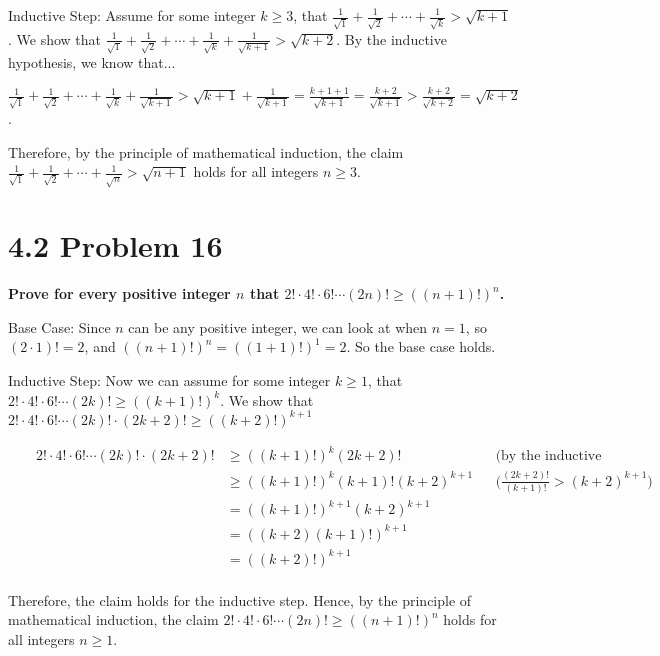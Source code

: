 \documentclass[10pt]{article}
\def \n {\par \vspace{\baselineskip}}
\begin{document}
\n
Inductive Step: Assume for some integer $k \geq 3$, that $\frac{1}{\sqrt{1}} + \frac{1}{\sqrt{2}} + \cdots + \frac{1}{\sqrt{k}} > \sqrt{k + 1}$.  
We show that $\frac{1}{\sqrt{1}} + \frac{1}{\sqrt{2}} + \cdots + \frac{1}{\sqrt{k}} + \frac{1}{\sqrt{k + 1}} > \sqrt{k + 2}$.
By the inductive hypothesis, we know that...

$\frac{1}{\sqrt{1}} + \frac{1}{\sqrt{2}} + \cdots + \frac{1}{\sqrt{k}} + \frac{1}{\sqrt{k + 1}} > \sqrt{k + 1} + \frac{1}{\sqrt{k + 1}}
= \frac{k + 1 + 1}{\sqrt{k + 1}}
= \frac{k + 2}{\sqrt{k + 1}} 
> \frac{k + 2}{\sqrt{k + 2}} 
= \sqrt{k + 2}$.

\n
Therefore, by the principle of mathematical induction, the claim $\frac{1}{\sqrt{1}} + \frac{1}{\sqrt{2}} + \cdots + \frac{1}{\sqrt{n}} > \sqrt{n + 1}$
holds for all integers $n \geq 3$.



\section{4.2 Problem 16}
\textbf{Prove for every positive integer $n$ that $2! \cdot 4! \cdot 6! \cdots (2n)! \geq ((n + 1)!)^n$.}

\n
Base Case: Since $n$ can be any positive integer, we can look at when $n = 1$, so $(2 \cdot 1)! = 2$, and
$((n + 1)!)^n = ((1 + 1)!)^1 = 2$.  So the base case holds.

\n
Inductive Step: Now we can assume for some integer $k \geq 1$, that $2! \cdot 4! \cdot 6! \cdots (2k)! \geq ((k + 1)!)^k$.  We show that
$2! \cdot 4! \cdot 6! \cdots (2k)! \cdot (2k + 2)! \geq ((k + 2)!)^{k + 1}$

\begin{align*}
    && 2! \cdot 4! \cdot 6! \cdots (2k)! \cdot (2k + 2)! &\geq ((k + 1)!)^k(2k + 2)! && \text{(by the inductive hypothesis)} \\
    && &\geq ((k + 1)!)^k(k + 1)!(k + 2)^{k + 1} && \Bigg(\frac{(2k + 2)!}{(k + 1)!} > (k + 2)^{k + 1}\Bigg) \\
    && &= ((k + 1)!)^{k + 1}(k + 2)^{k + 1} && \\
    && &= ((k + 2)(k + 1)!)^{k + 1} && \\
    && &= ((k + 2)!)^{k + 1} && \\
\end{align*}

Therefore, the claim holds for the inductive step.  Hence, by the principle of mathematical induction, the claim
$2! \cdot 4! \cdot 6! \cdots (2n)! \geq ((n + 1)!)^n$ holds for all integers $n \geq 1$.
\end{document}
